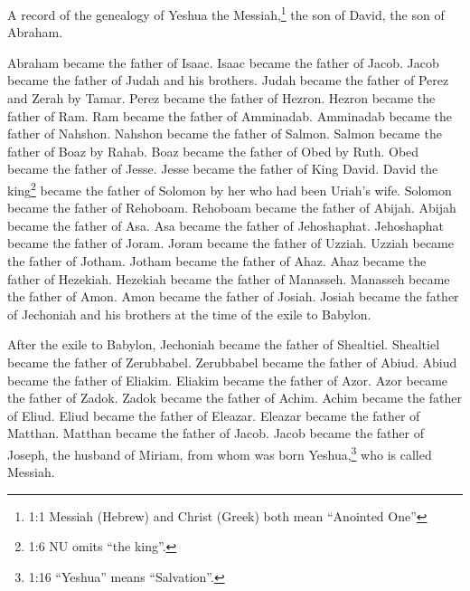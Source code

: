 



\vspace{-1.36in}


\mychapter{} \myverse*{}A record of the genealogy of Yeshua the Messiah,\footnote{1:1 Messiah (Hebrew) and Christ (Greek) both mean “Anointed One”} the son of David, the son
of Abraham.

\myverse{}Abraham became the father of Isaac. Isaac became the father of
Jacob. Jacob became the father of Judah and his brothers.
\myverse{}Judah became the father of Perez and Zerah by Tamar. Perez became the father
of Hezron. Hezron became the father of Ram.
\myverse{}Ram became the father of Amminadab. Amminadab became the father of Nahshon.
Nahshon became the father of Salmon.
\myverse{}Salmon became the father of Boaz by Rahab. Boaz became the father of Obed by
Ruth. Obed became the father of Jesse.
\myverse{}Jesse became the father of King David. David the king\footnote{1:6 NU omits “the king”.} became the father of Solomon by her who had been Uriah’s wife.
\myverse{}Solomon became the father of Rehoboam. Rehoboam became the father of Abijah.
Abijah became the father of Asa.
\myverse{}Asa became the father of Jehoshaphat. Jehoshaphat became the father of Joram.
Joram became the father of Uzziah.
\myverse{}Uzziah became the father of Jotham. Jotham became the father of Ahaz. Ahaz became
the father of Hezekiah.
\myverse{}Hezekiah became the father of Manasseh. Manasseh became the father of Amon.
Amon became the father of Josiah.
\myverse{}Josiah became the father of Jechoniah and his brothers at the time of the
exile to Babylon.

\myverse{}After the exile to Babylon, Jechoniah became the father of Shealtiel.
Shealtiel became the father of Zerubbabel.
\myverse{}Zerubbabel became the father of Abiud. Abiud became the father of Eliakim.
Eliakim became the father of Azor.
\myverse{}Azor became the father of Zadok. Zadok became the father of Achim. Achim became
the father of Eliud.
\myverse{}Eliud became the father of Eleazar. Eleazar became the father of Matthan.
Matthan became the father of Jacob.
\myverse{}Jacob became the father of Joseph, the husband of Miriam, from whom was born
Yeshua,\footnote{1:16 “Yeshua” means “Salvation”.} who is called Messiah.

